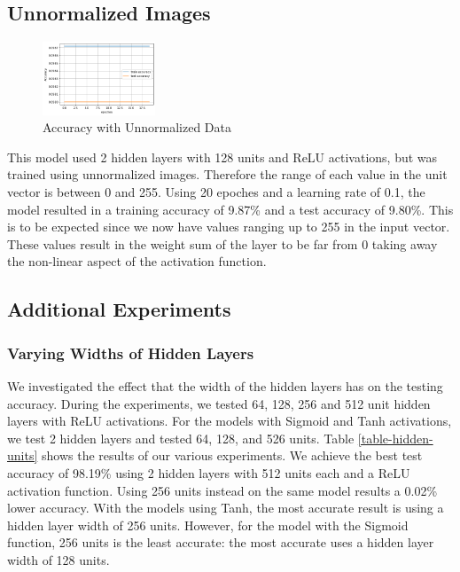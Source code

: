 \documentclass[11pt]{homework}
\begin{document}
\subsection{Unnormalized Images}
\begin{figure} %
    \centering
    \includegraphics[width=0.3\textwidth]{acc-unnoramlized.png}
    \caption{Accuracy with Unnormalized Data }
    \label{exp-4-acc}
\end{figure}
This model used 2 hidden layers with 128 units and ReLU activations, but was trained using unnormalized images. Therefore the range of each value in the unit vector is between 0 and 255. Using 20 epoches and a learning rate of 0.1, the model resulted in a training accuracy of 9.87\% and a test accuracy of 9.80\%. This is to be expected since we now have values ranging up to 255 in the input vector. These values result in the weight sum of the layer to be far from 0 taking away the non-linear aspect of the activation function. 



\subsection{Additional Experiments}
\subsubsection{Varying Widths of Hidden Layers}
We investigated the effect that the width of the hidden layers has on the testing accuracy. During the experiments, we tested 64, 128, 256 and 512 unit hidden layers with ReLU activations. For the models with Sigmoid and Tanh activations, we test 2 hidden layers and tested 64, 128, and 526 units.  Table \ref{table-hidden-units} shows the results of our various experiments. We achieve the best test accuracy of 98.19\% using 2 hidden layers with 512 units each and a ReLU activation function. Using 256 units instead on the same model results a 0.02\% lower accuracy. With the models using Tanh, the most accurate result is using a hidden layer width of 256 units. However, for the model with the Sigmoid function, 256 units is the least accurate: the most accurate uses a hidden layer width of 128 units.
\end{document}
